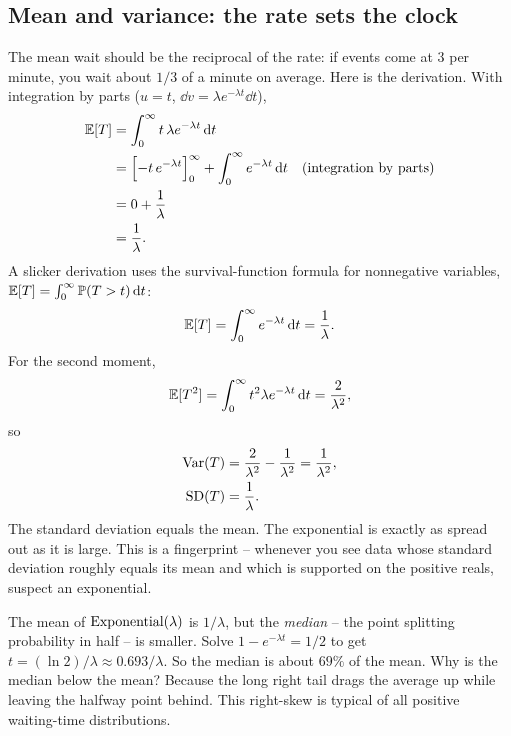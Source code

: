 \subsection{Mean and variance: the rate sets the clock}
The mean wait should be the reciprocal of the rate: if events come at $3$ per
minute, you wait about $1/3$ of a minute on average. Here is the derivation. With
integration by parts ($u = t$, $\dd v = \lambda e^{-\lambda t}\dd t$),
\begin{align*}
  \operatorname{\mathbb{E}}[T] &= \int_0^\infty t\,\lambda e^{-\lambda t}\,\mathrm{d} t \\
        &= \Bigl[-t\,e^{-\lambda t}\Bigr]_0^\infty + \int_0^\infty e^{-\lambda t}\,\mathrm{d} t \quad \text{(integration by parts)} \\
        &= 0 + \frac{1}{\lambda} \\
        &= \frac{1}{\lambda}.
\end{align*}
A slicker derivation uses the survival-function formula for nonnegative
variables, $\operatorname{\mathbb{E}}[T] = \int_0^\infty \operatorname{\mathbb{P}}(T>t)\,\mathrm{d} t$:
\[
  \operatorname{\mathbb{E}}[T] = \int_0^\infty e^{-\lambda t}\,\mathrm{d} t = \frac{1}{\lambda}.
\]
For the second moment,
\[
  \operatorname{\mathbb{E}}[T^2] = \int_0^\infty t^2 \lambda e^{-\lambda t}\,\mathrm{d} t = \frac{2}{\lambda^2},
\]
so
\begin{align*}
  \operatorname{Var}(T) &= \frac{2}{\lambda^2} - \frac{1}{\lambda^2} = \frac{1}{\lambda^2}, \\
  \operatorname{SD}(T) &= \frac{1}{\lambda}.
\end{align*}
The standard deviation equals the mean. The
exponential is exactly as spread out as it is large. This is a fingerprint --
whenever you see data whose standard deviation roughly equals its mean and which
is supported on the positive reals, suspect an exponential.
\begin{walkbox}
The mean of $\operatorname{Exponential}(\lambda)$ is $1/\lambda$, but the \emph{median} -- the point
splitting probability in half -- is smaller. Solve $1 - e^{-\lambda t} = 1/2$ to
get $t = (\ln 2)/\lambda \approx 0.693/\lambda$. So the median is about $69\%$ of
the mean. Why is the median below the mean? Because the long right tail drags the
average up while leaving the halfway point behind. This right-skew is typical of
all positive waiting-time distributions.
\end{walkbox}
